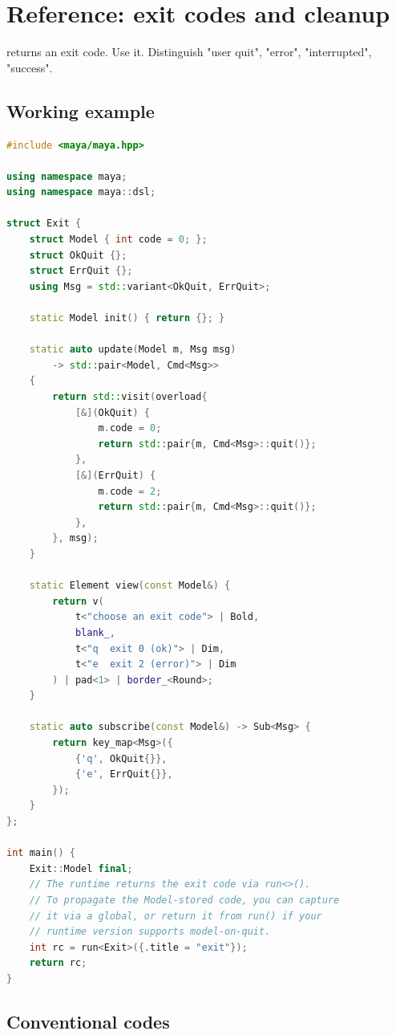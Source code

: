 \chapter{Reference: exit codes and cleanup}
\label{ch:refman-exit}

\begin{aside}
 returns an exit code. Use it. Distinguish
"user quit", "error", "interrupted", "success".
\end{aside}

\section{Working example}

\begin{lstlisting}[language=C++]
#include <maya/maya.hpp>

using namespace maya;
using namespace maya::dsl;

struct Exit {
    struct Model { int code = 0; };
    struct OkQuit {};
    struct ErrQuit {};
    using Msg = std::variant<OkQuit, ErrQuit>;

    static Model init() { return {}; }

    static auto update(Model m, Msg msg)
        -> std::pair<Model, Cmd<Msg>>
    {
        return std::visit(overload{
            [&](OkQuit) {
                m.code = 0;
                return std::pair{m, Cmd<Msg>::quit()};
            },
            [&](ErrQuit) {
                m.code = 2;
                return std::pair{m, Cmd<Msg>::quit()};
            },
        }, msg);
    }

    static Element view(const Model&) {
        return v(
            t<"choose an exit code"> | Bold,
            blank_,
            t<"q  exit 0 (ok)"> | Dim,
            t<"e  exit 2 (error)"> | Dim
        ) | pad<1> | border_<Round>;
    }

    static auto subscribe(const Model&) -> Sub<Msg> {
        return key_map<Msg>({
            {'q', OkQuit{}},
            {'e', ErrQuit{}},
        });
    }
};

int main() {
    Exit::Model final;
    // The runtime returns the exit code via run<>().
    // To propagate the Model-stored code, you can capture
    // it via a global, or return it from run() if your
    // runtime version supports model-on-quit.
    int rc = run<Exit>({.title = "exit"});
    return rc;
}
\end{lstlisting}

\section{Conventional codes}

